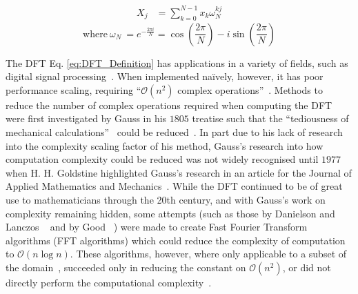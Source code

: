 \begin{align}
    X_j &= \sum_{k=0}^{N-1}x_k\omega_N^{kj}\label{eq:DFT_Definition}
\end{align}
\begin{equation}
    \text{where}~\omega_N~=e^{-\frac{2\pi i}{N}}
    = \cos{\left(\frac{2\pi}{N}\right)}-i\sin{\left(\frac{2\pi}{N}\right)}\label{eq:ComplexRootsOfUnity}
\end{equation}

The DFT Eq. \ref{eq:DFT_Definition} has applications in a variety of fields, 
such as digital signal processing~\cite{Bellanger2024}.
When implemented naïvely, however, it has poor performance scaling, requiring  
``$\mathcal{O}\left(n^2\right)$ complex operations''~\cite{VanLoan1992}.
Methods to reduce the number of complex operations required when computing the DFT were first investigated by Gauss in his $1805$ treatise such that the ``tediousness of mechanical calculations''~\cite{Gauss1866} could be reduced~\cite{Heideman1985}.
In part due to his lack of research into the complexity scaling factor of his method, Gauss's research into how computation complexity could be reduced was not widely recognised until $1977$ when H. H. Goldstine highlighted Gauss's research in an article for the Journal of Applied Mathematics and Mechanics~\cite{Heideman1985}\cite{Heinrich1980}.
While the DFT continued to be of great use to mathematicians through the 20th century, and with Gauss's work on complexity remaining hidden, some attempts (such as those by Danielson and Lanczos ~\cite{Danielson1942} and by Good ~\cite{Good1958}) were made to create Fast Fourier Transform algorithms (FFT algorithms) which could reduce the complexity of computation to $\mathcal{O}\left(n\log n\right)$.
These algorithms, however, where only applicable to a subset of the domain~\cite{Good1958}, succeeded only in reducing the constant on $\mathcal{O}\left(n^2\right)$, or did not directly perform the computational complexity~\cite{Danielson1942}.

